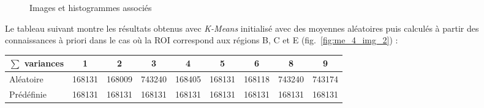 	\begin{figure}[!ht]	%
	  	\centering
	  			\hspace{2em}
				\hspace{2em}
		  	\caption{Images et histogrammes associés}
	\end{figure}

		Le tableau suivant montre les résultats obtenus avec \emph{K-Means} initialisé avec des moyennes aléatoires puis calculés à partir des connaissances à priori dans le cas où la ROI correspond aux régions B, C et E (fig.~\ref{fig:me_4_img_2}) :
		
	\begin{center}
		\begin{tabular}{|l|c|c|c|c|c|c|c|c|}
			\hline
			 \textbf{$\sum$ variances} & \textbf{1}	& \textbf{2} & \textbf{3}	& \textbf{4} & \textbf{5}	& \textbf{6}  & \textbf{8}	& \textbf{9} \\
			\hline
				Aléatoire	 			& 168131	& 168009	& 743240		& 168405	& 168131		& 168118	& 743240		& 743174	\\
			 	Prédéfinie				& 168131	& 168131	& 168131		& 168131	& 168131		& 168131 	& 168131		& 168131	\\
			 \hline	
		\end{tabular}
		\label{tab:centroid_benefit}
	\end{center}
	
